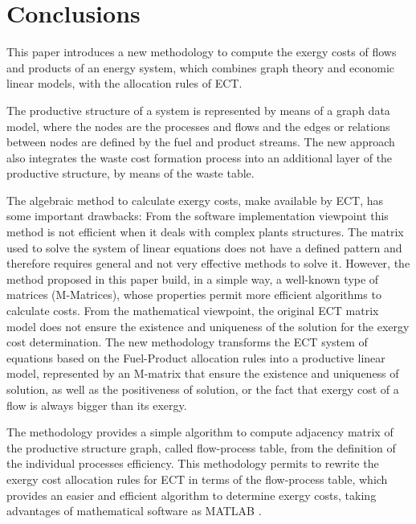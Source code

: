 \documentclass{ecos2018}
\begin{document}
\section{Conclusions}
This paper introduces a new methodology to compute the exergy costs of flows and products of an energy system, which combines graph theory and economic linear models, with the allocation rules of ECT.

The productive structure of a system is represented by means of a graph data model, where the nodes are the processes and flows and the edges or relations between nodes are defined by the fuel and product streams. The new approach also integrates the waste cost formation process into an additional layer of the productive structure, by means of the waste table.

The algebraic method to calculate exergy costs, make available by ECT, has some important drawbacks:
From the software implementation viewpoint this method is not efficient when it deals with complex plants structures. The matrix used to solve the system of linear equations does not have a defined pattern and therefore requires general and not very effective methods to solve it. However, the method proposed in this paper build, in a simple way, a well-known type of matrices (M-Matrices), whose properties permit more efficient algorithms to calculate costs. From the mathematical viewpoint, the original ECT matrix model does not ensure the existence and uniqueness of the solution for the exergy cost determination. The new methodology transforms the ECT system of equations based on the Fuel-Product allocation rules into a productive linear model, represented by an M-matrix that ensure the existence and uniqueness of solution, as well as the positiveness of solution, or the fact that exergy cost of a flow is always bigger than its exergy.

The methodology provides a simple algorithm to compute adjacency matrix of the productive structure graph, called flow-process table, from the definition of the individual processes efficiency. This methodology permits to rewrite the exergy cost allocation rules for ECT in terms of the flow-process table, which provides an easier and efficient algorithm to determine exergy costs, taking advantages of  mathematical software as MATLAB \circledR.
\end{document}
